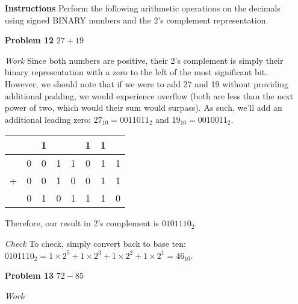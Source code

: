 \documentclass[12pt]{article}
\begin{document}
\begin{enumerate}
  \item[\textbf{Instructions}] Perform the following arithmetic operations on the decimals using signed BINARY numbers and the 2’s complement representation.
\end{enumerate}

\begin{enumerate}
  \item[\textbf{Problem 12}] $27+19$
\end{enumerate}

\begin{enumerate}
  \item[\textit{Work}] Since both numbers are positive, their 2's complement is simply their binary representation with a zero to the left of the most significant bit. However, we should note that if we were to add 27 and 19 without providing additional padding, we would experience overflow (both are less than the next power of two, which would their sum would surpass). As such, we'll add an additional leading zero: $27_{10} = 0011011_2$ and $19_{10} = 0010011_2$.
  \item[]
  \begin{center}
    \begin{tabular}{c@{\,}c@{\,}c@{\,}c@{\,}c@{\,}c@{\,}c@{\,}c}
      &   & 1 &   &   & 1 & 1 &   \\    \hline
      & 0 & 0 & 1 & 1 & 0 & 1 & 1 \\
    + & 0 & 0 & 1 & 0 & 0 & 1 & 1 \\    \hline
      & 0 & 1 & 0 & 1 & 1 & 1 & 0
    \end{tabular}
  \end{center}
  \item[] Therefore, our result in 2's complement is $0101110_2$.
  \item[\textit{Check}] To check, simply convert back to base ten: $0101110_2 = 1\times2^5+1\times2^3+1\times2^2+1\times2^1=46_{10}$.
\end{enumerate}


\begin{enumerate}
  \item[\textbf{Problem 13}] $72-85$
\end{enumerate}

\begin{enumerate}
  \item[\textit{Work}]
\end{enumerate}
\end{document}
